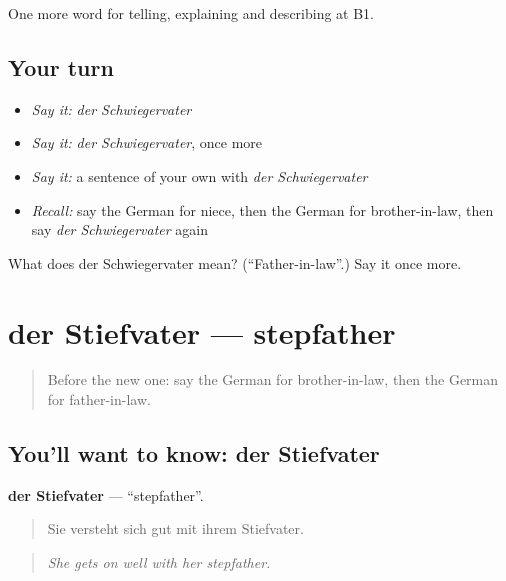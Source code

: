 \begin{grammarlens}[title={What you've built}]
One more word for telling, explaining and describing at B1.
\end{grammarlens}

\subsection*{Your turn}
\begin{itemize}
\raggedright
  \item \emph{Say it:} \emph{der Schwiegervater}
  \item \emph{Say it:} \emph{der Schwiegervater}, once more
  \item \emph{Say it:} a sentence of your own with \emph{der Schwiegervater}
  \item \emph{Recall:} say the German for niece, then the German for brother-in-law, then say \emph{der Schwiegervater} again
\end{itemize}

\begin{tcolorbox}[breakable,colback=teal!4,colframe=teal!35!black,title={Before you move on}]
What does der Schwiegervater mean? (\textquotedblleft{}Father-in-law\textquotedblright{}.) Say it once more.
\end{tcolorbox}
\section[der Stiefvater]{der Stiefvater — stepfather}

\label{lesson:GE-C490-stiefvater}



\begin{quote}
Before the new one: say the German for brother-in-law, then the German for father-in-law.
\end{quote}

\subsection*{You'll want to know: der Stiefvater}
\textbf{der Stiefvater} — \textquotedblleft{}stepfather\textquotedblright{}.

\begin{quote}
Sie versteht sich gut mit ihrem Stiefvater.
\end{quote}

\begin{quote}
\emph{She gets on well with her stepfather.}
\end{quote}

